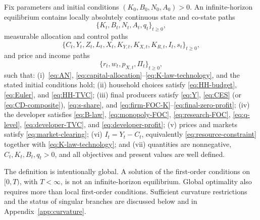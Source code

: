 \begin{definition}[Equilibrium]
\label{def:equilibrium}
Fix parameters and initial conditions
$(K_0,B_0,N_0,A_0)>0$.
An infinite-horizon equilibrium contains locally absolutely continuous state and co-state paths
\[
 \{K_t,B_t,N_t,A_t,q_t\}_{t\geq0},
\]
measurable allocation and control paths
\[
 \{C_t,Y_t,Z_t,L_t,X_t,K_{Y,t},K_{X,t},K_{R,t},I_t,s_t\}_{t\geq0},
\]
and price and income paths
\[
 \{r_t,w_t,p_{X,t},\Pi_t\}_{t\geq0},
\]
such that: (i)~\eqref{eq:AN}, \eqref{eq:capital-allocation}--\eqref{eq:K-law-technology}, and the stated initial conditions hold; (ii) household choices satisfy \eqref{eq:HH-budget}, \eqref{eq:Euler}, and \eqref{eq:HH-TVC}; (iii) final producers satisfy \eqref{eq:Y}, \eqref{eq:CES} (or \eqref{eq:CD-composite}), \eqref{eq:s-share}, and \eqref{eq:firm-FOC-K}--\eqref{eq:final-zero-profit}; (iv) the developer satisfies \eqref{eq:B-law}, \eqref{eq:monopoly-FOC}, \eqref{eq:research-FOC}, \eqref{eq:q-level}, \eqref{eq:developer-TVC}, and \eqref{eq:developer-profit}; (v) prices and markets satisfy \eqref{eq:market-clearing}; (vi) $I_t=Y_t-C_t$, equivalently \eqref{eq:resource-constraint} together with \eqref{eq:K-law-technology}; and (vii) quantities are nonnegative, $C_t,K_t,B_t,q_t>0$, and all objectives and present values are well defined.
\end{definition}

The definition is intentionally global. A solution of the first-order conditions on $[0,T)$, with $T<\infty$, is not an infinite-horizon equilibrium. Global optimality also requires more than local first-order conditions. Sufficient curvature restrictions and the status of singular branches are discussed below and in Appendix~\ref{app:curvature}.
